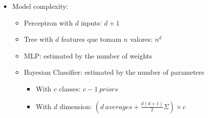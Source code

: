 \documentclass[twocolumn, 10pt]{article}
\begin{document}
\begin{itemize}[leftmargin=*, itemsep=0pt]
\begin{itemize}[topsep=0pt, itemsep=0pt]
    \end{itemize}

    \item Model complexity:
    \begin{itemize}[topsep=0pt, itemsep=0pt]
        \item Perceptron with $d$ inputs: $d+1$
        \item Tree with $d$ features que tomam $n$ valores: $\displaystyle n^d$
        \item MLP: estimated by the number of weights
        \item Bayesian Classifier: estimated by the number of parameters
        \begin{itemize}[topsep=0pt, itemsep=0pt]
            \item With $c$ classes: $c-1\ priors$
            \item With $d$ dimension: $\displaystyle (d\ averages+\frac{d(d+1)}{2}\Sigma)\times c$
        \end{itemize}
    \end{itemize}

\end{itemize}
\end{document}
